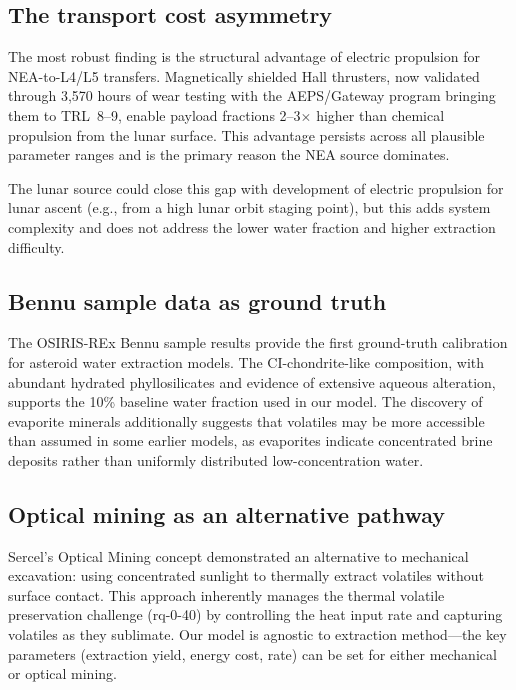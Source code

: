 \documentclass[preprint,12pt]{elsarticle}
\begin{document}
\subsection{The transport cost asymmetry}

The most robust finding is the structural advantage of electric propulsion for NEA-to-L4/L5 transfers. Magnetically shielded Hall thrusters, now validated through 3,570 hours of wear testing \cite{frieman2019} with the AEPS/Gateway program bringing them to TRL~8--9, enable payload fractions 2--3$\times$ higher than chemical propulsion from the lunar surface. This advantage persists across all plausible parameter ranges and is the primary reason the NEA source dominates.

The lunar source could close this gap with development of electric propulsion for lunar ascent (e.g., from a high lunar orbit staging point), but this adds system complexity and does not address the lower water fraction and higher extraction difficulty.

\subsection{Bennu sample data as ground truth}

The OSIRIS-REx Bennu sample results \cite{lauretta2024,glavin2025,mccoy2025} provide the first ground-truth calibration for asteroid water extraction models. The CI-chondrite-like composition, with abundant hydrated phyllosilicates and evidence of extensive aqueous alteration, supports the 10\% baseline water fraction used in our model. The discovery of evaporite minerals \cite{mccoy2025} additionally suggests that volatiles may be more accessible than assumed in some earlier models, as evaporites indicate concentrated brine deposits rather than uniformly distributed low-concentration water.

\subsection{Optical mining as an alternative pathway}

Sercel's Optical Mining concept \cite{sercel2019} demonstrated an alternative to mechanical excavation: using concentrated sunlight to thermally extract volatiles without surface contact. This approach inherently manages the thermal volatile preservation challenge (rq-0-40) by controlling the heat input rate and capturing volatiles as they sublimate. Our model is agnostic to extraction method---the key parameters (extraction yield, energy cost, rate) can be set for either mechanical or optical mining.
\end{document}
